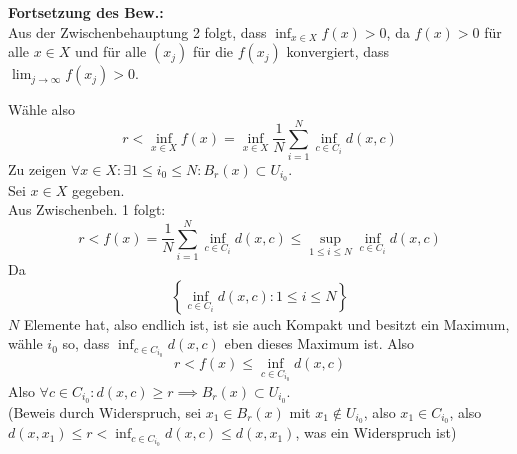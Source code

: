 \documentclass[sectionformat=aufgabe]{gadsescript}
\begin{document}
\begin{description}
		\textbf{Fortsetzung des Bew.:}\\
		Aus der Zwischenbehauptung 2 folgt, dass $ \inf_{x \in X} f(x) > 0 $, da $ f(x) > 0 $ für alle $ x \in X $ und für alle $ (x_j) $ für die $ f(x_j) $ konvergiert, dass $ \lim_{j \to \infty}  f(x_j) > 0 $.

		Wähle also
		\[
			r < \inf_{x \in X} f(x) = \inf_{x \in X} \frac{ 1 }{ N } \sum_{i=1}^{N} \inf_{c \in C_i} d(x, c)
		\]
		Zu zeigen $ \forall x \in X : \exists 1 \leq i_0 \leq N : B_{r}(x) \subset U_{i_0}  $.\\
		Sei $ x \in X $ gegeben.\\
		Aus Zwischenbeh. 1 folgt:
		\[ 
			r < f(x) = \frac{ 1 }{ N } \sum_{i=1}^{N} \inf_{c \in C_i} d(x, c) \leq \sup_{1 \leq i \leq N} \inf_{c \in C_{i} } d(x, c)
		\]
		Da 
		\[
			\left\{ \inf_{c \in C_i} d(x, c) : 1 \leq i \leq N \right\} 
		\]
		$ N $ Elemente hat, also endlich ist, ist sie auch Kompakt und besitzt ein Maximum, wähle $ i_0 $ so, dass $ \inf_{c \in C_{i_0} } d(x, c) $ eben dieses Maximum ist.
		Also
		\[ 
			r < f(x) \leq \inf_{c \in C_{i_0} } d(x, c)
		\]
		Also $ \forall c \in C_{i_0} : d(x, c) \geq r \implies B_{r}(x) \subset U_{i_0}  $.\\
		(Beweis durch Widerspruch, sei $ x_1 \in B_{r}(x)  $ mit $ x_1 \not\in U_{i_0}  $, also $ x_1 \in C_{i_0} $, also $ d(x, x_1) \leq r < \inf_{c \in C_{i_0}} d(x, c) \leq d(x, x_1) $, was ein Widerspruch ist)
		
\end{description}
\end{document}
